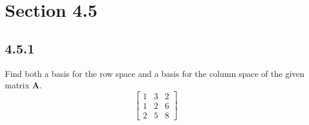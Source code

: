 \documentclass{article}
\begin{document}
\newcommand{\hr}{\par\noindent\rule{\textwidth}{0.4pt}}

\newcommand{\bc}[1]{
	\begin{equation*}
		\begin{boxed}
			{#1}
		\end{boxed}
	\end{equation*}
}

\newcommand{\cond}[2]{
	\ifmmode
		{#1} \quad {#2}
	\else
		$$ {#1} \quad {#2} $$
	\fi
}

\newcommand{\matr}[1]{\mathbf{#1}}
\newcommand{\rows}{\text{rowspace}}
\newcommand{\cols}{\text{colspace}}
\newcommand{\rref}{\text{rref}}
\newcommand{\set}[1]{\mathit{#1}}

\tableofcontents

\section{Section 4.5}

\subsection{4.5.1}

Find both a basis for the row space and a basis for the column space of the given matrix $ \matr{A} $.
\begin{equation*}
	\begin{bmatrix}
		1 & 3 & 2 \\
		1 & 2 & 6 \\
		2 & 5 & 8
	\end{bmatrix}
\end{equation*}
\end{document}
